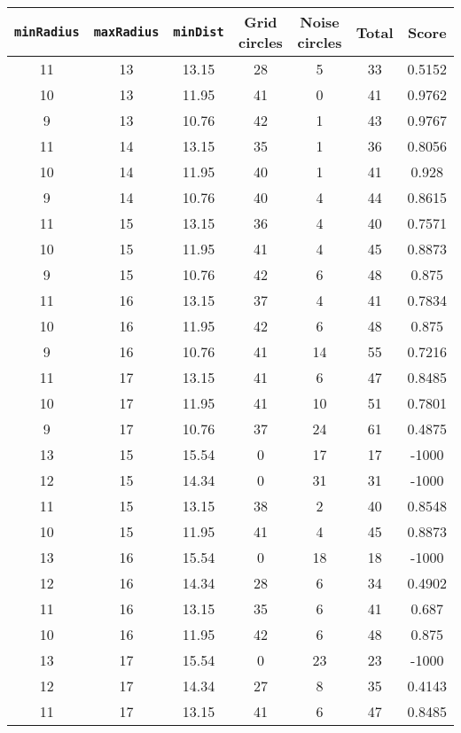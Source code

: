 \documentclass[letterpaper, 12pt]{article}
\begin{document}
\begin{longtable}{|c|c|c|c|c|c|c|}
\hline
\textbf{\texttt{minRadius}} & \textbf{\texttt{maxRadius}} & \textbf{\texttt{minDist}} & \textbf{Grid circles} & \textbf{Noise circles} & \textbf{Total} & \textbf{Score} \\
\hline
11 & 13 & 13.15 & 28 & 5 & 33 & 0.5152 \\
\hline
10 & 13 & 11.95 & 41 & 0 & 41 & 0.9762 \\
\hline
9 & 13 & 10.76 & 42 & 1 & 43 & 0.9767 \\
\hline
11 & 14 & 13.15 & 35 & 1 & 36 & 0.8056 \\
\hline
10 & 14 & 11.95 & 40 & 1 & 41 & 0.928 \\
\hline
9 & 14 & 10.76 & 40 & 4 & 44 & 0.8615 \\
\hline
11 & 15 & 13.15 & 36 & 4 & 40 & 0.7571 \\
\hline
10 & 15 & 11.95 & 41 & 4 & 45 & 0.8873 \\
\hline
9 & 15 & 10.76 & 42 & 6 & 48 & 0.875 \\
\hline
11 & 16 & 13.15 & 37 & 4 & 41 & 0.7834 \\
\hline
10 & 16 & 11.95 & 42 & 6 & 48 & 0.875 \\
\hline
9 & 16 & 10.76 & 41 & 14 & 55 & 0.7216 \\
\hline
11 & 17 & 13.15 & 41 & 6 & 47 & 0.8485 \\
\hline
10 & 17 & 11.95 & 41 & 10 & 51 & 0.7801 \\
\hline
9 & 17 & 10.76 & 37 & 24 & 61 & 0.4875 \\
\hline
13 & 15 & 15.54 & 0 & 17 & 17 & -1000 \\
\hline
12 & 15 & 14.34 & 0 & 31 & 31 & -1000 \\
\hline
11 & 15 & 13.15 & 38 & 2 & 40 & 0.8548 \\
\hline
10 & 15 & 11.95 & 41 & 4 & 45 & 0.8873 \\
\hline
13 & 16 & 15.54 & 0 & 18 & 18 & -1000 \\
\hline
12 & 16 & 14.34 & 28 & 6 & 34 & 0.4902 \\
\hline
11 & 16 & 13.15 & 35 & 6 & 41 & 0.687 \\
\hline
10 & 16 & 11.95 & 42 & 6 & 48 & 0.875 \\
\hline
13 & 17 & 15.54 & 0 & 23 & 23 & -1000 \\
\hline
12 & 17 & 14.34 & 27 & 8 & 35 & 0.4143 \\
\hline
11 & 17 & 13.15 & 41 & 6 & 47 & 0.8485 \\
\hline

\end{longtable}
\end{document}
